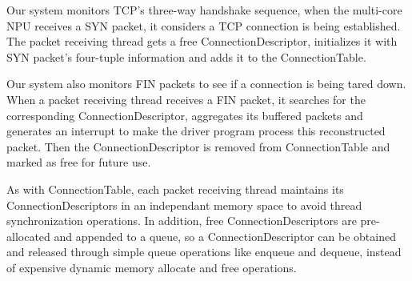 \documentclass[conference]{IEEEtran}
\begin{document}
Our system monitors TCP's three-way handshake sequence, when the multi-core NPU receives a SYN packet, it considers a TCP connection is being established. The packet receiving thread gets a free ConnectionDescriptor, initializes it with SYN packet's four-tuple information and adds it to the ConnectionTable.

Our system also monitors FIN packets to see if a connection is being tared down. When a packet receiving thread receives a FIN packet, it searches for the corresponding ConnectionDescriptor, aggregates its buffered packets and generates an interrupt to make the driver program process this reconstructed packet. Then the ConnectionDescriptor is removed from ConnectionTable and marked as free for future use.

As with ConnectionTable, each packet receiving thread maintains its ConnectionDescriptors in an independant memory space to avoid thread synchronization operations. In addition, free ConnectionDescriptors are pre-allocated and appended to a queue, so a ConnectionDescriptor can be obtained and released through simple queue operations like enqueue and dequeue, instead of expensive dynamic memory allocate and free operations.
\end{document}
